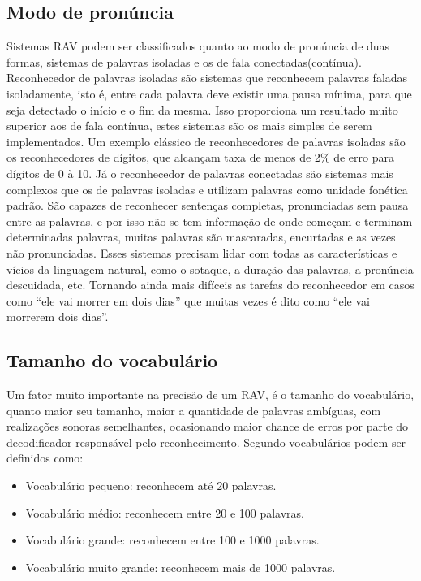 \subsection{Modo de pronúncia}
Sistemas RAV podem ser classificados quanto ao modo de pronúncia de duas formas, sistemas de palavras isoladas e os de fala conectadas(contínua). Reconhecedor de palavras isoladas são sistemas que reconhecem palavras faladas isoladamente, isto é, entre cada palavra deve existir uma pausa mínima, para que seja detectado o início e o fim da mesma. Isso proporciona um resultado muito superior aos de fala contínua, estes sistemas são os mais simples de serem implementados. Um exemplo clássico de reconhecedores de palavras isoladas são os reconhecedores de dígitos, que alcançam taxa de menos de 2{\%} de erro para dígitos de 0 à 10.\cite{RavPtBr}
Já o reconhecedor de palavras conectadas são sistemas mais complexos que os de palavras isoladas e utilizam palavras como unidade fonética padrão. São capazes de reconhecer sentenças completas, pronunciadas sem pausa entre as palavras, e por isso não se tem informação de onde começam 
e terminam determinadas palavras, muitas palavras são mascaradas, encurtadas e as vezes não 
pronunciadas. Esses sistemas precisam lidar com todas as características e vícios da linguagem natural, como o sotaque, a duração das palavras, a pronúncia descuidada, etc. Tornando ainda mais difíceis as tarefas do reconhecedor em casos como “ele vai morrer em dois dias” que 
muitas vezes  é dito como “ele vai morrerem dois dias”.\cite{RavPtBr}

\subsection{Tamanho do vocabulário}
Um fator muito importante na precisão de um RAV, é o tamanho do vocabulário, quanto maior seu tamanho, maior a quantidade de palavras ambíguas, com realizações sonoras semelhantes, ocasionando maior chance de erros por parte do decodificador responsável pelo reconhecimento.\cite{RavPtBr} Segundo \cite{RavIsoladas} vocabulários podem ser definidos como:

\begin{itemize}
\item Vocabulário pequeno: reconhecem até 20 palavras. 
\item Vocabulário médio: reconhecem entre 20 e 100 palavras. 
\item Vocabulário grande: reconhecem entre 100 e 1000 palavras. 
\item Vocabulário muito grande: reconhecem mais de 1000 palavras. 
\end{itemize}

